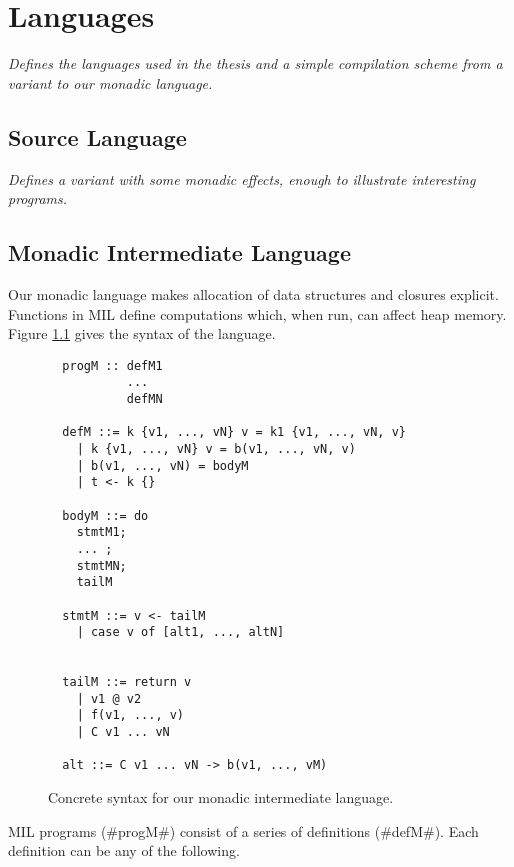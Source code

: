 \documentclass[12pt]{report}
\begin{document}


\chapter{Languages}
\label{ref_chapter_languages}

\emph{Defines the languages used in the thesis and a simple
  compilation scheme from a \lamA variant to our monadic language. }

\section{Source Language}

\emph{Defines a \lamA variant with some monadic effects, enough to
  illustrate interesting programs.}

\section{Monadic Intermediate Language}


Our monadic language makes allocation
of data structures and closures explicit. Functions in MIL 
define computations which, when run, can affect heap memory. Figure 
\ref{figMILDef} gives the syntax of the language. 


\begin{figure}[h]
\begin{verbatim}
  progM :: defM1
           ...
           defMN

  defM ::= k {v1, ..., vN} v = k1 {v1, ..., vN, v} 
    | k {v1, ..., vN} v = b(v1, ..., vN, v)
    | b(v1, ..., vN) = bodyM
    | t <- k {}

  bodyM ::= do 
    stmtM1; 
    ... ; 
    stmtMN; 
    tailM

  stmtM ::= v <- tailM
    | case v of [alt1, ..., altN]


  tailM ::= return v
    | v1 @ v2
    | f(v1, ..., v)
    | C v1 ... vN

  alt ::= C v1 ... vN -> b(v1, ..., vM)

\end{verbatim}
\caption{Concrete syntax for our monadic intermediate language.}
\label{figMILDef}
\end{figure}

MIL programs (#progM#) consist of a series of definitions (#defM#). Each
definition can be any of the following.
\end{document}

